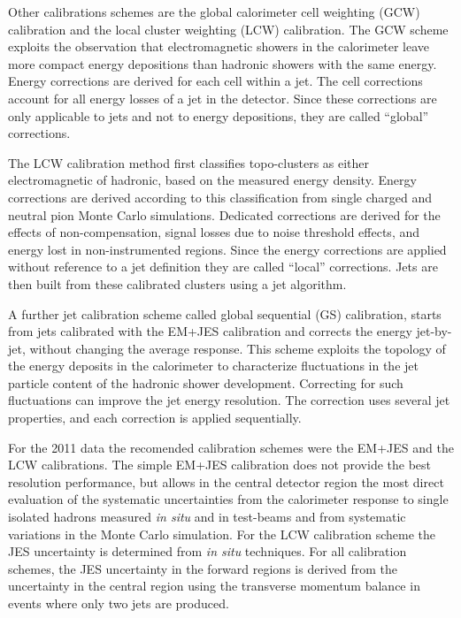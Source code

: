 Other calibrations schemes are the global calorimeter cell weighting (GCW) calibration and the local cluster weighting (LCW) calibration.  The GCW scheme exploits the observation that electromagnetic showers in the calorimeter leave more compact energy depositions than hadronic showers with the same energy.  Energy corrections are derived for each cell within a jet.  The cell corrections account for all energy losses of a jet in the detector. Since these corrections are only applicable to jets and not to energy depositions, they are called ``global'' corrections.

The LCW calibration method first classifies topo-clusters as either electromagnetic of hadronic, based on the measured energy density. Energy corrections are derived according to this classification from single charged and neutral pion Monte Carlo simulations. Dedicated corrections are derived for the effects of non-compensation, signal losses due to noise threshold effects, and energy lost in non-instrumented regions. Since the energy corrections are applied without reference to a jet definition they are called ``local'' corrections. Jets are then built from these calibrated clusters using a jet algorithm.  


A further jet calibration scheme called global sequential (GS) calibration, starts from jets calibrated with the EM+JES calibration and corrects the energy jet-by-jet, without changing the average response. This scheme exploits the topology of the energy deposits in the calorimeter to characterize fluctuations in the jet particle content of the hadronic shower development.  Correcting for such fluctuations can improve the jet energy resolution. The correction uses several jet properties, and each correction is applied sequentially.


For the 2011 data the recomended calibration schemes were the EM+JES and the LCW calibrations. The simple EM+JES calibration does not provide the best resolution performance, but allows in the central detector region the most direct evaluation of the systematic uncertainties from the calorimeter response to single isolated hadrons measured \emph{in situ}  and in test-beams and from systematic variations in the Monte Carlo simulation.  For the LCW calibration scheme the JES uncertainty is determined from \emph{in situ}  techniques. For all calibration schemes, the JES uncertainty in the forward regions is derived from the uncertainty in the central region using the transverse momentum balance in events where only two jets are produced. 




